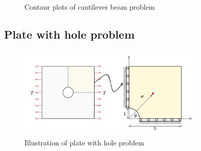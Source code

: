 \begin{figure}[!ht]
\centering
\caption{Contour plots of cantilever beam problem}\label{cantilever_contour}
\end{figure}

\subsection{Plate with hole problem}

\begin{figure}[!ht]
\centering
\includegraphics[width=0.8\textwidth]{png/plate_with_hole_model.png}
\caption{Illustration of plate with hole problem}\label{plate_with_hole_1}
\end{figure}

